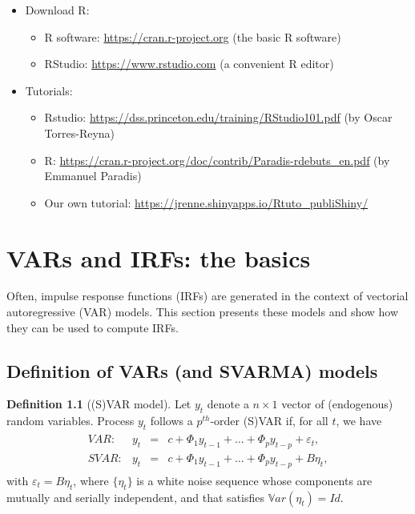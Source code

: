 \documentclass[
  12pt,
]{book}
\providecommand{\tightlist}{%
  \setlength{\itemsep}{0pt}\setlength{\parskip}{0pt}}
\theoremstyle{definition}
\newtheorem{definition}{Definition}[chapter]
\theoremstyle{definition}
\theoremstyle{definition}
\theoremstyle{definition}
\theoremstyle{remark}
\begin{document}
\begin{itemize}
\item
  Download R:

  \begin{itemize}
  \tightlist
  \item
    R software: \url{https://cran.r-project.org} (the basic R software)
  \item
    RStudio: \url{https://www.rstudio.com} (a convenient R editor)
  \end{itemize}
\item
  Tutorials:

  \begin{itemize}
  \tightlist
  \item
    Rstudio: \url{https://dss.princeton.edu/training/RStudio101.pdf} (by Oscar Torres-Reyna)
  \item
    R: \url{https://cran.r-project.org/doc/contrib/Paradis-rdebuts_en.pdf} (by Emmanuel Paradis)
  \item
    Our own tutorial: \url{https://jrenne.shinyapps.io/Rtuto_publiShiny/}
  \end{itemize}
\end{itemize}

\chapter{VARs and IRFs: the basics}\label{basics}

Often, impulse response functions (IRFs) are generated in the context of vectorial autoregressive (VAR) models. This section presents these models and show how they can be used to compute IRFs.

\section{Definition of VARs (and SVARMA) models}\label{definition-of-vars-and-svarma-models}

\begin{definition}[(S)VAR model]
\protect\hypertarget{def:SVAR}{}\label{def:SVAR}Let \(y_{t}\) denote a \(n \times1\) vector of (endogenous) random variables. Process \(y_{t}\) follows a \(p^{th}\)-order (S)VAR if, for all \(t\), we have
\begin{eqnarray}
\begin{array}{rllll}
VAR:& y_t &=& c + \Phi_1 y_{t-1} + \dots + \Phi_p y_{t-p} + \varepsilon_t,\\
SVAR:& y_t &=& c + \Phi_1 y_{t-1} + \dots + \Phi_p y_{t-p} + B \eta_t,
\end{array}
\label{eq:yVAR}
\end{eqnarray}
with \(\varepsilon_t = B\eta_t\), where \(\{\eta_{t}\}\) is a white noise sequence whose components are mutually and serially independent, and that satisfies \(\mathbb{V}ar(\eta_t)=Id\).
\end{definition}
\end{document}
